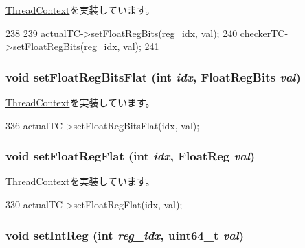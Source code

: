 \hyperlink{classThreadContext_a8f0c8b07cd1c4a6019a5b3922689d1db}{ThreadContext}を実装しています。


\begin{DoxyCode}
238     {
239         actualTC->setFloatRegBits(reg_idx, val);
240         checkerTC->setFloatRegBits(reg_idx, val);
241     }
\end{DoxyCode}
\hypertarget{classCheckerThreadContext_acd974292ff0461c2e94c0b5a1126b503}{
\subsubsection[{setFloatRegBitsFlat}]{\setlength{\rightskip}{0pt plus 5cm}void setFloatRegBitsFlat (int {\em idx}, \/  {\bf FloatRegBits} {\em val})}}
\label{classCheckerThreadContext_acd974292ff0461c2e94c0b5a1126b503}


\hyperlink{classThreadContext_a2964ca7e974bf80017ee30d832b32a35}{ThreadContext}を実装しています。


\begin{DoxyCode}
336     { actualTC->setFloatRegBitsFlat(idx, val); }
\end{DoxyCode}
\hypertarget{classCheckerThreadContext_a71ec23ca2c029120932e5af4babc0da1}{
\subsubsection[{setFloatRegFlat}]{\setlength{\rightskip}{0pt plus 5cm}void setFloatRegFlat (int {\em idx}, \/  {\bf FloatReg} {\em val})}}
\label{classCheckerThreadContext_a71ec23ca2c029120932e5af4babc0da1}


\hyperlink{classThreadContext_a01392cdc362f9d589f90e57bcc519623}{ThreadContext}を実装しています。


\begin{DoxyCode}
330     { actualTC->setFloatRegFlat(idx, val); }
\end{DoxyCode}
\hypertarget{classCheckerThreadContext_abc264e8ee37c6bd7d7b5759b97c34356}{
\subsubsection[{setIntReg}]{\setlength{\rightskip}{0pt plus 5cm}void setIntReg (int {\em reg\_\-idx}, \/  uint64\_\-t {\em val})}}
\label{classCheckerThreadContext_abc264e8ee37c6bd7d7b5759b97c34356}


